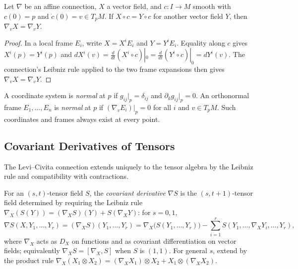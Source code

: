 \begin{lemma}
  \label{lem:pet-ch2-locality-along-curve}


  Let $\nabla$ be an affine connection, $X$ a vector field, and $c:I\to M$
  smooth with $c(0)=p$ and $\dot c(0)=v\in T_pM$. If $X\circ c=Y\circ c$
  for another vector field $Y$, then $\nabla_vX=\nabla_vY$.
\end{lemma}
\begin{proof}

  \sketch
  In a local frame $E_i$, write
  $X=X^iE_i$ and $Y=Y^iE_i$. Equality along $c$ gives
  $X^i(p)=Y^i(p)$ and
  $dX^i(v)=\frac d{dt}(X^i\circ c)|_0
          =\frac d{dt}(Y^i\circ c)|_0=dY^i(v)$.
  The connection's Leibniz rule applied to the two frame expansions then
  gives $\nabla_vX=\nabla_vY$.
\end{proof}

\begin{definition}
  \label{def:pet-ch2-normal-coordinates-frame}


  A coordinate system is \emph{normal} at $p$ if $g_{ij}|_p=\delta_{ij}$ and
  $\partial_kg_{ij}|_p=0$. An orthonormal frame $E_1,\dots,E_n$ is \emph{normal}
  at $p$ if $(\nabla_vE_i)|_p=0$ for all $i$ and $v\in T_pM$. Such coordinates
  and frames always exist at every point.
\end{definition}

\subsection{Covariant Derivatives of Tensors}

The Levi--Civita connection extends uniquely to the tensor algebra by the
Leibniz rule and compatibility with contractions.

\begin{definition}
  \label{def:pet-ch2-covariant-derivative-tensor}


  For an $(s,t)$-tensor field $S$, the \emph{covariant derivative} $\nabla S$
  is the $(s,t+1)$-tensor field determined by requiring the Leibniz rule
  $\nabla_X(S(Y))=(\nabla_XS)(Y)+S(\nabla_XY)$: for $s=0,1$,
  \[
    \nabla S(X,Y_1,\dots,Y_r)=(\nabla_XS)(Y_1,\dots,Y_r)
    =\nabla_X\big(S(Y_1,\dots,Y_r)\big)-\sum_{i=1}^rS(Y_1,\dots,\nabla_XY_i,\dots,Y_r),
  \]
  where $\nabla_X$ acts as $D_X$ on functions and as covariant differentiation
  on vector fields; equivalently $\nabla_XS=[\nabla_X,S]$ when $S$ is
  $(1,1)$. For general $s$, extend by the product rule
  $\nabla_X(X_1\otimes X_2)=(\nabla_XX_1)\otimes X_2+X_1\otimes(\nabla_XX_2)$.
\end{definition}

